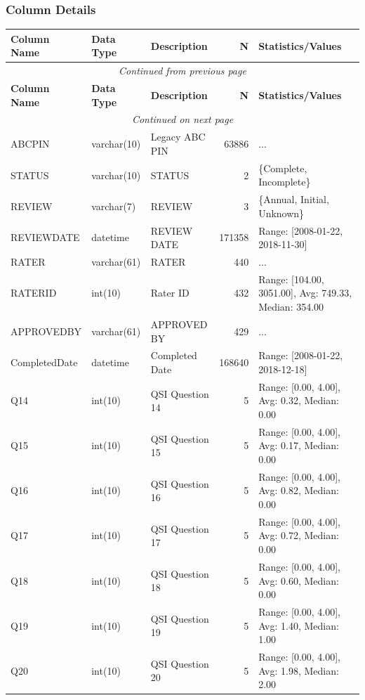 \begin{landscape}
\subsubsection{Column Details}
\begin{longtable}{|l|l|l|r|p{6cm}|}
\hline
\textbf{Column Name} & \textbf{Data Type} & \textbf{Description} & \textbf{N} & \textbf{Statistics/Values} \\
\hline
\endfirsthead
\multicolumn{5}{c}{\textit{Continued from previous page}} \\
\hline
\textbf{Column Name} & \textbf{Data Type} & \textbf{Description} & \textbf{N} & \textbf{Statistics/Values} \\
\hline
\endhead
\hline
\multicolumn{5}{c}{\textit{Continued on next page}} \\
\endfoot
\hline
\endlastfoot
ABCPIN & varchar(10) & Legacy ABC PIN & 63886 & ... \\
\hline
STATUS & varchar(10) & STATUS & 2 & \{Complete, Incomplete\} \\
\hline
REVIEW & varchar(7) & REVIEW & 3 & \{Annual, Initial, Unknown\} \\
\hline
REVIEWDATE & datetime & REVIEW DATE & 171358 & Range: [2008-01-22, 2018-11-30] \\
\hline
RATER & varchar(61) & RATER & 440 & ... \\
\hline
RATERID & int(10) & Rater ID & 432 & Range: [104.00, 3051.00], Avg: 749.33, Median: 354.00 \\
\hline
APPROVEDBY & varchar(61) & APPROVED BY & 429 & ... \\
\hline
CompletedDate & datetime & Completed Date & 168640 & Range: [2008-01-22, 2018-12-18] \\
\hline
Q14 & int(10) & QSI Question 14 & 5 & Range: [0.00, 4.00], Avg: 0.32, Median: 0.00 \\
\hline
Q15 & int(10) & QSI Question 15 & 5 & Range: [0.00, 4.00], Avg: 0.17, Median: 0.00 \\
\hline
Q16 & int(10) & QSI Question 16 & 5 & Range: [0.00, 4.00], Avg: 0.82, Median: 0.00 \\
\hline
Q17 & int(10) & QSI Question 17 & 5 & Range: [0.00, 4.00], Avg: 0.72, Median: 0.00 \\
\hline
Q18 & int(10) & QSI Question 18 & 5 & Range: [0.00, 4.00], Avg: 0.60, Median: 0.00 \\
\hline
Q19 & int(10) & QSI Question 19 & 5 & Range: [0.00, 4.00], Avg: 1.40, Median: 1.00 \\
\hline
Q20 & int(10) & QSI Question 20 & 5 & Range: [0.00, 4.00], Avg: 1.98, Median: 2.00 \\

\end{longtable}
\end{landscape}
